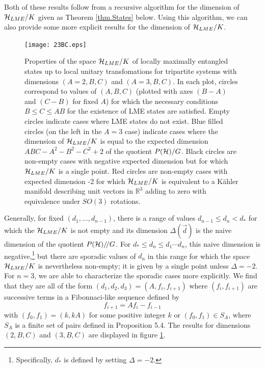 \documentclass[12pt]{article}
\theoremstyle{definition}
\newcommand{\be}{\begin{equation}}
\newcommand{\ee}{\end{equation}}
\newcommand{\GITquot}{/\!/}
\begin{document}
Both of these results follow from a recursive algorithm for the dimension of ${\cal H}_{LME}/K$ given as Theorem \ref{thm.States} below. Using this algorithm, we can also provide some more explicit results
for the dimension of ${\cal H}_{LME}/K$.


\begin{figure}
\centering
\texttt{[image: 23BC.eps]}
\caption{Properties of the space ${\cal H}_{LME}/K$ of locally maximally entangled states up to local unitary transfomations for tripartite systems with dimensions $(A=2,B,C)$ and $(A=3,B,C)$. In each plot, circles correspond to values of $(A,B,C)$ (plotted with axes $(B-A)$ and $(C-B)$ for fixed $A$) for which the necessary conditions $B \le C \le AB$ for the existence of LME states are satisfied. Empty circles indicate cases where LME states do not exist. Blue filled circles (on the left in the $A=3$ case) indicate cases where the dimension of ${\cal H}_{LME}/K$ is equal to the expected dimension $ABC - A^2 - B^2 - C^2 + 2$ of the quotient $P({\cal H})/G$. Black circles are non-empty cases with negative expected dimension but for which ${\cal H}_{LME}/K$ is a single point. Red circles are non-empty cases with expected dimension -2 for which ${\cal H}_{LME}/K$ is equivalent to a K\"ahler manifold describing unit vectors in $\mathbb{R}^3$ adding to zero with equivalence under $SO(3)$ rotations.}
\label{fig:23BC}
\end{figure}

Generally, for fixed
$(d_1,\dots, d_{n-1})$, there is a range of values $d_{n-1} \le d_n <
d_*$ for which the ${\cal H}_{LME}/K$ is not empty and its dimension $\Delta(\vec{d})$
is the naive dimension of the quotient $P({\cal H})\GITquot G$. For $d_* \le d_n \le d_1 \cdots d_n$,
this naive dimension is negative,\footnote{Specifically, $d_*$ is
defined by setting $\Delta = -2$.} but there are sporadic values of
$d_n$ in this range for which the space ${\cal H}_{LME}/K$ is
nevertheless non-empty; it is given by a single point unless $\Delta =
-2$. For $n=3$, we are able to characterize the sporadic cases more explicitly. We find that they are all of the form $(d_1,d_2,d_3) = (A, f_i, f_{i+1})$ where $(f_i,f_{i+1})$ are successive terms in a Fibonnaci-like sequence defined by
\be
\label{Fib0}
f_{i+1} = A f_i - f_{i-1}
\ee
with $(f_0,f_1) = (k,kA)$ for some positive integer $k$ or $(f_0,f_1) \in S_A$, where $S_A$ is a finite set of pairs defined in Proposition 5.4. The results for dimensions $(2,B,C)$ and $(3,B,C)$ are displayed in figure \ref{fig:23BC}.
\end{document}
